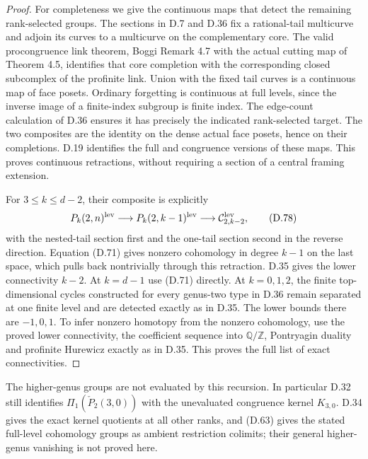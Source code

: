 \begin{proof}
For completeness we give the continuous maps that detect
the remaining rank-selected groups.  The sections in
D.7 and D.36 fix a rational-tail multicurve and adjoin
its curves to a multicurve on the complementary core.
The valid procongruence link theorem, Boggi Remark 4.7
with the actual cutting map of Theorem 4.5, identifies
that core completion with the corresponding closed
subcomplex of the profinite link.  Union with the fixed
tail curves is a continuous map of face posets.  Ordinary
forgetting is continuous at full levels, since the
inverse image of a finite-index subgroup is finite
index.  The edge-count calculation of D.36 ensures it
has precisely the indicated rank-selected target.
The two composites are the identity on the dense
actual face posets, hence on their completions.  D.19
identifies the full and congruence versions of these
maps.  This proves continuous retractions, without
requiring a section of a central framing extension.

For $3\leq k\leq d-2$, their composite is explicitly
\[
 P_k(2,n)^{\rm lev}\longrightarrow
 P_k(2,k-1)^{\rm lev}\longrightarrow
 \mathcal C_{2,k-2}^{\rm lev},                                \tag{D.78}
\]
with the nested-tail section first and the one-tail
section second in the reverse direction.  Equation
(D.71) gives nonzero cohomology in degree $k-1$ on
the last space, which pulls back nontrivially through
this retraction.  D.35 gives the lower connectivity
$k-2$.  At $k=d-1$ use (D.71) directly.  At $k=0,1,2$,
the finite top-dimensional cycles constructed for
every genus-two type in D.36 remain separated at one
finite level and are detected exactly as in D.35.
The lower bounds there are $-1,0,1$.
To infer nonzero homotopy from the nonzero cohomology,
use the proved lower connectivity, the coefficient
sequence into $\mathbb Q/\mathbb Z$, Pontryagin duality
and profinite Hurewicz exactly as in D.35.  This proves
the full list of exact connectivities.
\end{proof}

The higher-genus groups are not evaluated by this recursion.
In particular D.32 still identifies
$\Pi_1(\check P_2(3,0))$ with the unevaluated congruence kernel
$K_{3,0}$.  D.34 gives the exact kernel quotients at all
other ranks, and (D.63) gives the stated full-level
cohomology groups as ambient restriction colimits;
their general higher-genus vanishing is not proved here.
